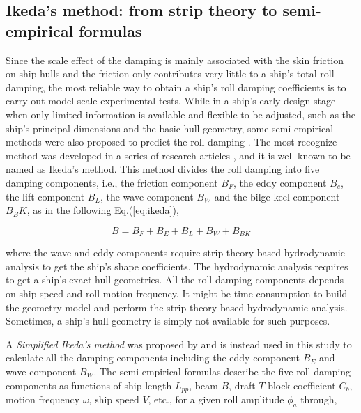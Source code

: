
\subsection{Ikeda's method: from strip theory to semi-empirical formulas}
\label{se:semi-empirical methods}
Since the scale effect of the damping is mainly associated with the skin friction on ship hulls and the friction only contributes very little to a ship's total roll damping, the most reliable way to obtain a ship's roll damping coefficients is to carry out model scale experimental tests. 
While in a ship's early design stage when only limited information is available and flexible to be adjusted, such as the ship's principal dimensions and the basic hull geometry, some semi-empirical methods were also proposed to predict the roll damping \parencite{himeno_prediction_1981}. The most recognize method was developed in a series of research articles \parencite{ikeda_roll_1978,ikeda_eddy_1978,ikeda_roll_1979,ikeda_components_1978,ikeda_velocity_1979}, and it is well-known to be named as Ikeda's method. This method divides the roll damping into five damping components, i.e., the friction component $B_F$, the eddy component $B_e$, the lift component $B_L$, the wave component $B_W$ and the bilge keel component $B_BK$, as in the following Eq.(\ref{eq:ikeda}), 

\begin{equation} \label{eq:ikeda}
B = B_F + B_E + B_L + B_W + B_{BK}
\end{equation}

where the wave and eddy components require strip theory based hydrodynamic analysis to get the ship's shape coefficients. The hydrodynamic analysis requires to get a ship's exact hull geometries. All the roll damping components depends on ship speed and roll motion frequency. It might be time consumption to build the geometry model and perform the strip theory based hydrodynamic analysis. Sometimes, a ship's hull geometry is simply not available for such purposes. 

A \emph{Simplified Ikeda's method} was proposed by \parencite{kawahara_simple_2011} and is instead used in this study to calculate all the damping components including the eddy component $B_E$ and wave component $B_W$. The semi-empirical formulas describe the five roll damping components as functions of ship length $L_{pp}$, beam $B$, draft $T$  block coefficient $C_{b}$, motion frequency $\omega$, ship speed $V$, etc., for a given roll amplitude $\phi_a$ through,

